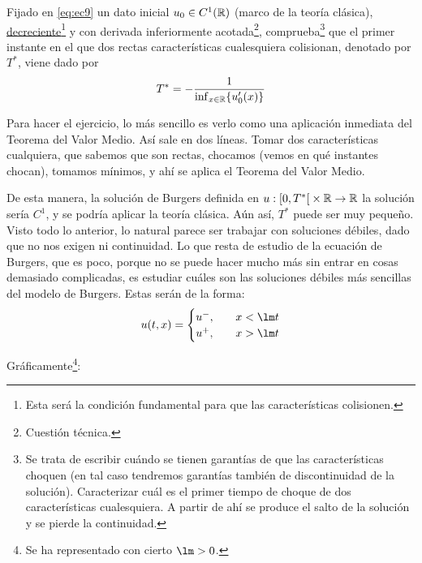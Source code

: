 \begin{ejercicio}\label{ejercicio:ej26}
    Fijado en \eqref{eq:ec9} un dato inicial $u_0 \in C^1(\mathbb{R})$ (marco de la teoría clásica), \underline{decreciente}\footnote{Esta será la condición fundamental para que 
    las características colisionen.} y con derivada inferiormente acotada\footnote{Cuestión técnica.}, comprueba\footnote{Se trata de escribir cuándo se tienen garantías de 
    que las características choquen (en tal caso tendremos garantías también de discontinuidad de la solución). Caracterizar cuál es el primer tiempo de choque de dos características 
    cualesquiera. A partir de ahí se produce el salto de la solución y se pierde la continuidad.} que el primer instante en el que dos rectas características 
    cualesquiera colisionan, denotado por $T^*$, viene dado por $$T^{*} = - \dfrac{1}{\inf_{x \in \mathbb{R}} \{u_0'(x)\}}$$

    Para hacer el ejercicio, lo más sencillo es verlo como una aplicación inmediata del Teorema del Valor Medio. Así sale en dos líneas. Tomar dos características cualquiera,
    que sabemos que son rectas, chocamos (vemos en qué instantes chocan), tomamos mínimos, y ahí se aplica el Teorema del Valor Medio.

\end{ejercicio}

De esta manera, la solución de Burgers definida en $u : \left[0, T^{*} \right[ \times \mathbb{R} \to \mathbb{R}$ la solución sería $C^1$, y se podría aplicar la teoría clásica. Aún así,
$T^{*}$ puede ser muy pequeño. \\


Visto todo lo anterior, lo natural parece ser trabajar con soluciones débiles, dado que no nos exigen ni continuidad. Lo que resta de estudio de la ecuación de Burgers, que es poco,
porque no se puede hacer mucho más sin entrar en cosas demasiado complicadas, es estudiar cuáles son las soluciones débiles más sencillas del modelo de Burgers. Estas serán de la forma:
\begin{equation}\label{eq:ec13}
    u(t,x) = \begin{cases}
        u^{-}, \quad& x < \lm t \\
        u^{+}, \quad& x > \lm t
    \end{cases}
\end{equation}

Gráficamente\footnote{Se ha representado con cierto $\lm > 0$.}:

